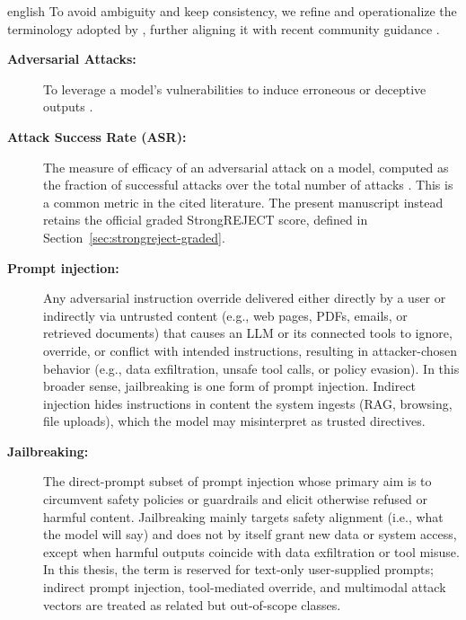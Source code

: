 \begin{otherlanguage*}{english}
To avoid ambiguity and keep consistency, we refine and operationalize the terminology adopted by \textcite{abdaliSecuringLargeLanguage2024a}, further aligning it with recent community guidance \cite{owasp_top_10_llm}.

\begin{description}

  \item[\textbf{Adversarial Attacks:}] To leverage a model's vulnerabilities to induce erroneous or deceptive outputs \cite{bachuLayerwiseAlignmentExamining2025, shayeganiSurveyVulnerabilitiesLarge2023}.

  \item[\textbf{Attack Success Rate (ASR):}] The measure of efficacy of an adversarial attack on a model, computed as the fraction of successful attacks over the total number of attacks \cite{wuPerformanceEvaluationAdversarial2021}. This is a common metric in the cited literature. The present manuscript instead retains the official graded StrongREJECT score, defined in Section~\ref{sec:strongreject-graded}.

  \item[\textbf{Prompt injection:}] Any adversarial instruction override delivered either directly by a user or indirectly via untrusted content (e.g., web pages, PDFs, emails, or retrieved documents) that causes an LLM or its connected tools to ignore, override, or conflict with intended instructions, resulting in attacker-chosen behavior (e.g., data exfiltration, unsafe tool calls, or policy evasion). In this broader sense, jailbreaking is one form of prompt injection. Indirect injection hides instructions in content the system ingests (RAG, browsing, file uploads), which the model may misinterpret as trusted directives.
  
  \item[\textbf{Jailbreaking:}] The direct-prompt subset of prompt injection whose primary aim is to circumvent safety policies or guardrails and elicit otherwise refused or harmful content. Jailbreaking mainly targets safety alignment (i.e., what the model will say) and does not by itself grant new data or system access, except when harmful outputs coincide with data exfiltration or tool misuse. In this thesis, the term is reserved for text-only user-supplied prompts; indirect prompt injection, tool-mediated override, and multimodal attack vectors are treated as related but out-of-scope classes.
  

\end{description}
\end{otherlanguage*}
